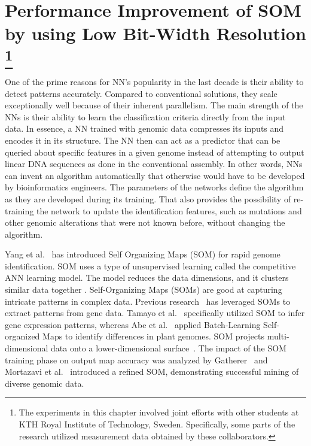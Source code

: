\graphicspath{{./Ch5-SOM/images/}}

\chapter[Performance Improvement of SOM by using Low Bit-Width Resolution]{Performance Improvement of SOM by using Low Bit-Width Resolution \footnote{The experiments in this chapter involved joint efforts with other students at KTH Royal Institute of Technology, Sweden. Specifically, some parts of the research utilized measurement data obtained by these collaborators.}} 
\label{chap:SOM}
One of the prime reasons for NN's popularity in the last decade is their ability to detect patterns accurately. Compared to conventional solutions, they scale exceptionally well because of their inherent parallelism. The main strength of the NNs is their ability to learn the classification criteria directly from the input data. In essence, a NN trained with genomic data compresses its inputs and encodes it in its structure. The NN then can act as a predictor that can be queried about specific features in a given genome instead of attempting to output linear DNA sequences as done in the conventional assembly. In other words, NNs can invent an algorithm automatically that otherwise would have to be developed by bioinformatics engineers. The parameters of the networks define the algorithm as they are developed during its training. That also provides the possibility of re-training the network to update the identification features, such as mutations and other genomic alterations that were not known before, without changing the algorithm.

Yang et al.~\cite{Yang2018RiBoSOM} has introduced Self Organizing Maps (SOM) for rapid genome identification. SOM uses a type of unsupervised learning called the competitive ANN learning model. The model reduces the data dimensions, and it clusters similar data together \cite{Kohonen2013}. Self-Organizing Maps (SOMs) are good at capturing intricate patterns in complex data. Previous research~\cite{tamayo1999interpreting, abe2009novel, mortazavi2013integrating, kohonen1990self, gatherer2007genome} has leveraged SOMs to extract patterns from gene data. Tamayo et al.~\cite{tamayo1999interpreting} specifically utilized SOM to infer gene expression patterns, whereas Abe et al.~\cite{abe2009novel} applied Batch-Learning Self-organized Maps to identify differences in plant genomes. SOM projects multi-dimensional data onto a lower-dimensional surface~\cite{kohonen1990self}. The impact of the SOM training phase on output map accuracy was analyzed by Gatherer~\cite{gatherer2007genome} and Mortazavi et al.~\cite{mortazavi2013integrating} introduced a refined SOM, demonstrating successful mining of diverse genomic data.

